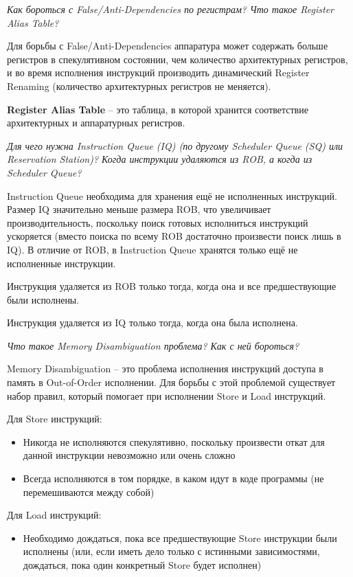 	\textit{Как бороться с False/Anti-Dependencies по регистрам? Что такое Register Alias Table?}
	
	Для борьбы с False/Anti-Dependencies аппаратура может содержать больше регистров в спекулятивном состоянии, чем количество архитектурных регистров, и во время исполнения инструкций производить динамический Register Renaming (количество архитектурных регистров не меняется).
	
	\textbf{Register Alias Table} -- это таблица, в которой хранится соответствие архитектурных и аппаратурных регистров.
	
	\textit{Для чего нужна Instruction Queue (IQ) (по другому Scheduler Queue (SQ) или Reservation Station)? Когда инструкции удаляются из ROB, а когда из Scheduler Queue?}
	
	Instruction Queue необходима для хранения ещё не исполненных инструкций. Размер IQ значительно меньше размера ROB, что увеличивает производительность, поскольку поиск готовых исполниться инструкций ускоряется (вместо поиска по всему ROB достаточно произвести поиск лишь в IQ). В отличие от ROB, в Instruction Queue хранятся только ещё не исполненные инструкции.
	
	Инструкция удаляется из ROB только тогда, когда она и все предшествующие были исполнены.
	
	Инструкция удаляется из IQ только тогда, когда она была исполнена.
	
	\textit{Что такое Memory Disambiguation проблема? Как с ней бороться?}
	
	Memory Disambiguation -- это проблема исполнения инструкций доступа в память в Out-of-Order исполнении. Для борьбы с этой проблемой существует набор правил, который помогает при исполнении Store и Load инструкций.
	
	Для Store инструкций:
	\begin{itemize}
		\item Никогда не исполняются спекулятивно, поскольку произвести откат для данной инструкции невозможно или очень сложно
		\item Всегда исполняются в том порядке, в каком идут в коде программы (не перемешиваются между собой)
	\end{itemize}
	
	Для Load инструкций:
	\begin{itemize}
		\item Необходимо дождаться, пока все предшествующие Store инструкции были исполнены (или, если иметь дело только с истинными зависимостями, дождаться, пока один конкретный Store будет исполнен)
	\end{itemize}
	
